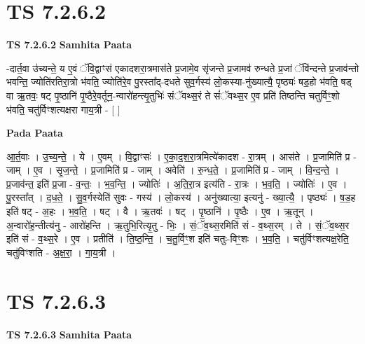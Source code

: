 \documentclass[17pt]{extarticle}
\begin{document}

\section{ TS 7.2.6.2 }

\textbf{TS 7.2.6.2 } \newline
\textbf{Samhita Paata} \newline

-दार्त॒वा उ॑च्यन्ते॒ य ए॒वं ॅवि॒द्वाꣳस॑ एकादशरा॒त्रमास॑ते प्र॒जामे॒व सृ॑जन्ते प्र॒जामव॑ रुन्धते प्र॒जां ॅवि॑न्दन्ते प्र॒जाव॑न्तो भवन्ति॒ ज्योति॑रतिरा॒त्रो भ॑वति॒ ज्योति॑रे॒व पु॒रस्ता᳚द्-दधते सुव॒र्गस्य॑ लो॒कस्या-नु॑ख्यात्यै॒ पृष्ठ्यः॑ षड॒हो भ॑वति॒ षड् वा ऋ॒तवः॒ षट् पृ॒ष्ठानि॑ पृ॒ष्ठैरे॒वर्तून॒-न्वारो॑हन्त्यृ॒तुभिः॑ संॅवथ्स॒रं ते सं॑ॅवथ्स॒र ए॒व प्रति॑ तिष्ठन्ति चतुर्विꣳ॒॒शो भ॑वति॒ चतु॑र्विꣳशत्यक्षरा गाय॒त्री - [  ] \newline

\textbf{Pada Paata} \newline

आ॒र्त॒वाः । उ॒च्य॒न्ते॒ । ये । ए॒वम् । वि॒द्वाꣳसः॑ । ए॒का॒द॒श॒रा॒त्रमित्ये॑कादश - रा॒त्रम् । आस॑ते । प्र॒जामिति॑ प्र - जाम् । ए॒व । सृ॒ज॒न्ते॒ । प्र॒जामिति॑ प्र - जाम् । अवेति॑ । रु॒न्ध॒ते॒ । प्र॒जामिति॑ प्र - जाम् । वि॒न्द॒न्ते॒ । प्र॒जाव॑न्त॒ इति॑ प्र॒जा - व॒न्तः॒ । भ॒व॒न्ति॒ । ज्योतिः॑ । अ॒ति॒रा॒त्र इत्य॑ति - रा॒त्रः । भ॒व॒ति॒ । ज्योतिः॑ । ए॒व । पु॒रस्ता᳚त् । द॒ध॒ते॒ । सु॒व॒र्गस्येति॑ सुवः - गस्य॑ । लो॒कस्य॑ । अनु॑ख्यात्या॒ इत्यनु॑ - ख्या॒त्यै॒ । पृष्ठ्यः॑ । ष॒ड॒ह इति॑ षट् - अ॒हः । भ॒व॒ति॒ । षट् । वै । ऋ॒तवः॑ । षट् । पृ॒ष्ठानि॑ । पृ॒ष्ठैः । ए॒व । ऋ॒तून् । अ॒न्वारो॑ह॒न्तीत्य॑नु - आरो॑हन्ति । ऋ॒तुभि॒रित्यृ॒तु - भिः॒ । सं॒ॅव॒थ्स॒रमिति॑ सं - व॒थ्स॒रम् । ते । सं॒ॅव॒थ्स॒र इति॑ सं - व॒थ्स॒रे । ए॒व । प्रतीति॑ । ति॒ष्ठ॒न्ति॒ । च॒तु॒र्विꣳ॒॒श इति॑ चतुः-विꣳ॒॒शः । भ॒व॒ति॒ । चतु॑र्विꣳशत्यक्ष॒रेति॒ चतु॑विꣳशति - अ॒क्ष॒रा॒ । गा॒य॒त्री ।  \newline





\section{ TS 7.2.6.3 }

\textbf{TS 7.2.6.3 } \newline
\textbf{Samhita Paata} \newline
\end{document}
